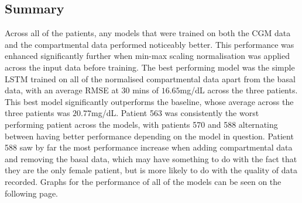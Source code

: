 	\subsection{Summary}
      
      Across all of the patients, any models that were trained on both the CGM data and the compartmental data performed noticeably better. This performance was enhanced significantly further when min-max scaling normalisation \cite{minmax} was applied across the input data before training. The best performing model was the simple LSTM trained on all of the normalised compartmental data apart from the basal data, with an average RMSE at 30 mins of $16.65$mg/dL across the three patients. This best model significantly outperforms the baseline, whose average across the three patients was $20.77$mg/dL. Patient 563 was consistently the worst performing patient across the models, with patients 570 and 588 alternating between having better performance depending on the model in question. Patient 588 saw by far the most performance increase when adding compartmental data and removing the basal data, which may have something to do with the fact that they are the only female patient, but is more likely to do with the quality of data recorded. Graphs for the performance of all of the models can be seen on the following page.
      \newpage
